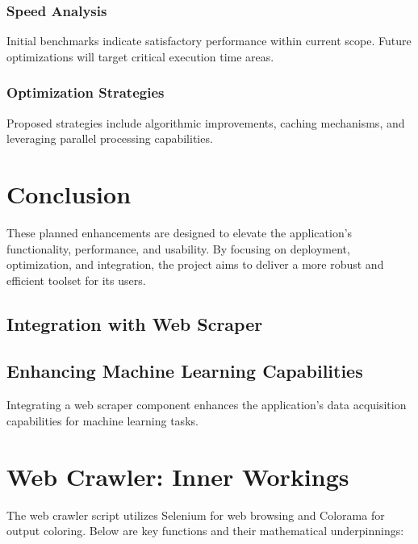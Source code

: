 \subsubsection*{Speed Analysis}

Initial benchmarks indicate satisfactory performance within current scope. Future optimizations will target critical execution time areas.

\subsubsection*{Optimization Strategies}

Proposed strategies include algorithmic improvements, caching mechanisms, and leveraging parallel processing capabilities.


\section*{Conclusion}

These planned enhancements are designed to elevate the application's functionality, performance, and usability. By focusing on deployment, optimization, and integration, the project aims to deliver a more robust and efficient toolset for its users.


\pagebreak

\subsection*{Integration with Web Scraper}

\subsection*{Enhancing Machine Learning Capabilities}

Integrating a web scraper component enhances the application's data acquisition capabilities for machine learning tasks.

\section*{Web Crawler: Inner Workings}

The web crawler script utilizes Selenium for web browsing and Colorama for output coloring. Below are key functions and their mathematical underpinnings:

